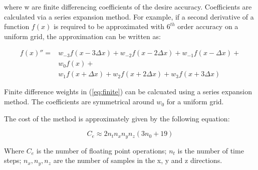 where w are finite differencing coefficients of the desire
accuracy. Coefficients are calculated via a series expansion
method. For example, if a second derivative of a function
\( f(x) \) is required to be approximated with \( 6^{th} \) order accuracy
on a uniform grid, the approximation can be written as:

\begin{equation}
  \begin{split}
    {f(x)}'' =
    & w_{-3}f\left( x - 3 \Delta x \right) +
      w_{-2}f\left( x - 2 \Delta x \right) +
      w_{-1}f\left( x - \Delta x   \right) + \\
    & w_{0}f\left( x \right) + \\
    & w_{1}f\left( x + \Delta x \right) +
      w_{2}f\left( x + 2 \Delta x \right) +
      w_{3}f\left( x + 3 \Delta x \right)
  \end{split}
  \label{eq:finite}
\end{equation}

Finite difference weights in (\ref{eq:finite}) can be calcuated using a
series expansion method. The coefficients are symmetrical around \( w_0 \)
for a uniform grid.

The cost of the method is approximately given by the following equation:

\begin{equation}
  C_e \approx 2n_t n_x n_y n_z \left( 3n_0 + 19 \right)
\end{equation}

Where \( C_e \) is the number of floating point operations; \( n_t \) is
the number of time steps; \( n_x , n_y , n_z \) are the number of samples
in the x, y and z directions.
